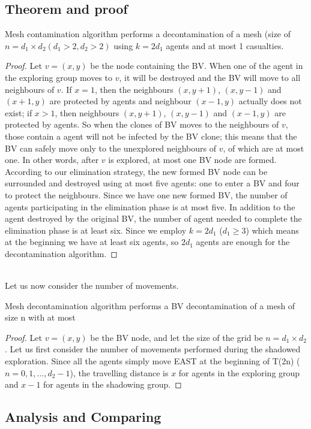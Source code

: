 \subsection{Theorem and proof}
\begin{theorem}
Mesh contamination algorithm performs a decontamination of a mesh (size of $n=d_1\times d_2(d_1>2,d_2>2)$ using $k=2d_1$ agents and at most 1 casualties.
\end{theorem}
\begin{proof}
Let $v=(x, y)$ be the node containing the BV. When one of the agent in the exploring group moves to $v$, it will be destroyed and the BV will move to all neighbours of $v$. If $x=1$, then the neighbours $(x, y+1)$, $(x, y-1)$ and $(x+1, y)$ are protected by agents and neighbour $(x-1, y)$ actually does not exist; if $x>1$, then neighbours $(x, y+1)$, $(x, y-1)$ and $(x-1, y)$ are protected by agents. So when the clones of BV moves to the neighbours of $v$, those contain a agent will not be infected by the BV clone; this means that the BV can safely move only to the unexplored neighbours of $v$, of which are at most one. In other words, after $v$ is explored, at most one BV node are formed. According to our elimination strategy, the new formed BV node can be surrounded and destroyed using at most five agents: one to enter a BV and four to protect the neighbours. Since we have one new formed BV, the number of agents participating in the elimination phase is at most five. In addition to the agent destroyed by the original BV, the number of agent needed to complete the elimination phase is at least six. Since we employ $k=2d_1$ ($d_1\geq 3$) which means at the beginning we have at least six agents, so $2d_1$ agents are enough for the decontamination algorithm.
\end{proof}
\\ Let us now consider the number of movements.\\
\begin{theorem}
Mesh decontamination algorithm performs a BV decontamination of a mesh of size n with at most 

\end{theorem}
\begin{proof}
Let $v=(x, y)$ be the BV node, and let the size of the grid be $n=d_1\times d_2$. Let us first consider the number of movements performed during the shadowed exploration. Since all the agents simply move EAST at the beginning of T(2n) ($n=0,1, \dots , d_2-1$), the travelling distance is $x$ for agents in the exploring group and $x-1$ for agents in the shadowing group.  
\end{proof}

\subsection{Analysis and Comparing}









